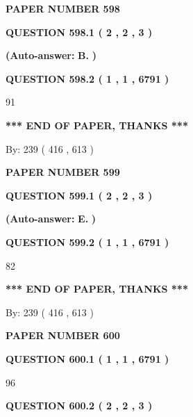 \documentclass[12pt]{article}
\begin{document}
   
\newpage 
\setcounter{page}{ 
   598001 } 
   
   
 {\textbf{ \Large{ PAPER NUMBER  598  }}}
   
   
   
   
  
  
{\textbf{\large{QUESTION
598.1 
 ( 2 , 2 , 3 )
}}}
 
 
{\textbf{(Auto-answer:}}
{\textbf{\large{
B.}}}
{\textbf{)}}
 
 
  
  
{\textbf{\large{QUESTION
598.2 
 ( 1 , 1 , 6791 )
}}}

91
   
   
   
   
\vspace{1.0in} 
{\textbf{\large{ *** END OF PAPER, THANKS *** }}} 
   
   
\hspace{1.0in} By: 
 239 ( 416 ,  613 )
   
   
   
   
\newpage 
\setcounter{page}{ 
   599001 } 
   
   
 {\textbf{ \Large{ PAPER NUMBER  599  }}}
   
   
   
   
  
  
{\textbf{\large{QUESTION
599.1 
 ( 2 , 2 , 3 )
}}}
 
 
{\textbf{(Auto-answer:}}
{\textbf{\large{
E.}}}
{\textbf{)}}
 
 
  
  
{\textbf{\large{QUESTION
599.2 
 ( 1 , 1 , 6791 )
}}}

82
   
   
   
   
\vspace{1.0in} 
{\textbf{\large{ *** END OF PAPER, THANKS *** }}} 
   
   
\hspace{1.0in} By: 
 239 ( 416 ,  613 )
   
   
   
   
\newpage 
\setcounter{page}{ 
   600001 } 
   
   
 {\textbf{ \Large{ PAPER NUMBER  600  }}}
   
   
   
   
  
  
{\textbf{\large{QUESTION
600.1 
 ( 1 , 1 , 6791 )
}}}

96
  
  
{\textbf{\large{QUESTION
600.2 
 ( 2 , 2 , 3 )
}}}
 
\end{document}
